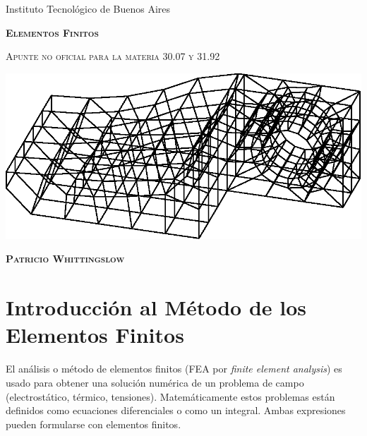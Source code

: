 \documentclass[11pt, a4paper,titlepage]{article}
\begin{document}
	\pagestyle{empty}
\begin{titlepage} %
	
\centering
{Instituto Tecnológico de Buenos Aires \par}
\vspace{2cm}

{\scshape \Huge \bf Elementos Finitos\par}

\vspace{.8cm}

{\scshape\Large Apunte no oficial para la materia 30.07 y 31.92 \par}
\vfill
\vspace{3cm}

{
	\centering
	\includegraphics[width=\textwidth]{fig/sear.eps}
	
}
\vfill

{\scshape\Large\textbf{Patricio Whittingslow} \par}
\vspace{4cm}
\medskip %

\end{titlepage} %
\tableofcontents
\clearpage

\pagestyle{plain}
\setcounter{page}{1}
\setcounter{section}{-1}
\section{Introducción al Método de los Elementos Finitos}
El análisis o método de elementos finitos (FEA por \textit{finite element analysis}) es usado para obtener una solución numérica de un problema de campo (electrostático, térmico, tensiones). Matemáticamente estos problemas están definidos como ecuaciones diferenciales o como un integral. Ambas expresiones pueden formularse con elementos finitos.
\end{document}
